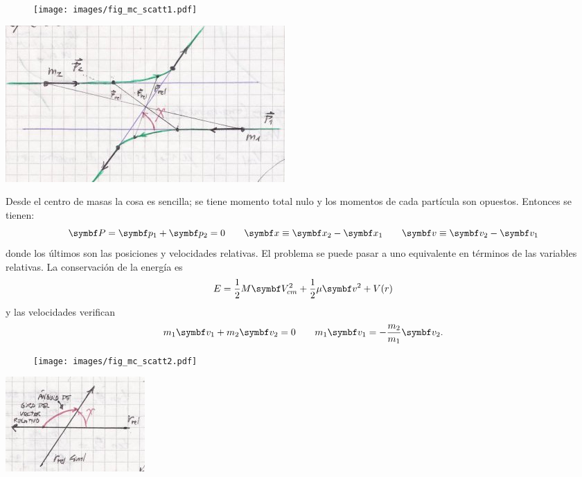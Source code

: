 \documentclass[10pt,oneside]{CBFT_book}
\begin{document}
\begin{figure}[htb]
	\begin{center}
	\texttt{[image: images/fig\_mc\_scatt1.pdf]}	 
	\end{center}
	\caption{}
\end{figure} 	
\includegraphics[scale=0.4]{images/fig_mc_dispersion_scatt_picture.jpg}

Desde el centro de masas la cosa es sencilla; se tiene momento total nulo y los momentos de cada partícula
son opuestos. Entonces se tienen:
\[
	\vb{P} = \vb{p}_1 + \vb{p}_2 = 0	\qquad		\vb{x} \equiv \vb{x}_2 - \vb{x}_1
	\qquad		\vb{v} \equiv \vb{v}_2 - \vb{v}_1
\]
donde los últimos son las posiciones y velocidades relativas. El problema se puede pasar a uno equivalente
en términos de las variables relativas.
La conservación de la energía es
\[
	E = \frac{1}{2} M \vb{V}_{cm}^2 + \frac{1}{2} \mu \vb{v}^2 + V(r)
\]
y las velocidades verifican
\[
	m_1 \vb{v}_1 + m_2 \vb{v}_2 = 0 \qquad m_1 \vb{v}_1 = -\frac{m_2}{m_1} \vb{v}_2.
\]
\begin{figure}[htb]
	\begin{center}
	\texttt{[image: images/fig\_mc\_scatt2.pdf]}	 
	\end{center}
	\caption{}
\end{figure} 


\includegraphics[scale=0.4]{images/fig_mc_dispersion_velrelativa.jpg}
\end{document}
